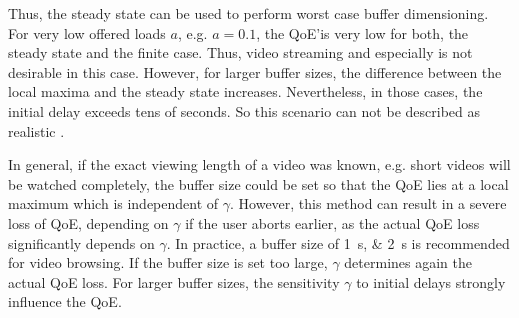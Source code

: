 Thus, the steady state can be used to perform worst case buffer dimensioning.
For very low offered loads \(a\), e.g. \(a = 0.1\), the \gls{QoE}'is very low for both, the steady state and the finite case. 
Thus, video streaming and especially \videoBrowsing is not desirable in this case. 
However, for larger buffer sizes, the difference between the local maxima and the steady state increases. 
Nevertheless, in those cases, the initial delay exceeds tens of seconds.
So this scenario can not be described as realistic \videoBrowsing.

In general, if the exact viewing length of a video was known, e.g. short videos will be watched completely, the buffer size could be set so that the \gls{QoE} lies at a local maximum which is independent of \(\gamma\).
However, this method can result in a severe loss of \gls{QoE}, depending on \(\gamma\) if the user aborts earlier, as the actual \gls{QoE} loss significantly depends on \(\gamma\). 
In practice, a buffer size of \SIlist{1;2}{\second} is recommended for video browsing. 
If the buffer size is set too large, \(\gamma\) determines again the actual \gls{QoE} loss.
For larger buffer sizes, the sensitivity \(\gamma\) to initial delays strongly influence the \gls{QoE}.